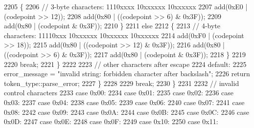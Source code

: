 \begin{DoxyCode}
2205                             \{
2206                                 \textcolor{comment}{// 3-byte characters: 1110xxxx 10xxxxxx 10xxxxxx}
2207                                 add(0xE0 | (codepoint >> 12));
2208                                 add(0x80 | ((codepoint >> 6) & 0x3F));
2209                                 add(0x80 | (codepoint & 0x3F));
2210                             \}
2211                             \textcolor{keywordflow}{else}
2212                             \{
2213                                 \textcolor{comment}{// 4-byte characters: 11110xxx 10xxxxxx 10xxxxxx 10xxxxxx}
2214                                 add(0xF0 | (codepoint >> 18));
2215                                 add(0x80 | ((codepoint >> 12) & 0x3F));
2216                                 add(0x80 | ((codepoint >> 6) & 0x3F));
2217                                 add(0x80 | (codepoint & 0x3F));
2218                             \}
2219 
2220                             \textcolor{keywordflow}{break};
2221                         \}
2222 
2223                         \textcolor{comment}{// other characters after escape}
2224                         \textcolor{keywordflow}{default}:
2225                             error\_message = \textcolor{stringliteral}{"invalid string: forbidden character after backslash"};
2226                             \textcolor{keywordflow}{return} token\_type::parse\_error;
2227                     \}
2228 
2229                     \textcolor{keywordflow}{break};
2230                 \}
2231 
2232                 \textcolor{comment}{// invalid control characters}
2233                 \textcolor{keywordflow}{case} 0x00:
2234                 \textcolor{keywordflow}{case} 0x01:
2235                 \textcolor{keywordflow}{case} 0x02:
2236                 \textcolor{keywordflow}{case} 0x03:
2237                 \textcolor{keywordflow}{case} 0x04:
2238                 \textcolor{keywordflow}{case} 0x05:
2239                 \textcolor{keywordflow}{case} 0x06:
2240                 \textcolor{keywordflow}{case} 0x07:
2241                 \textcolor{keywordflow}{case} 0x08:
2242                 \textcolor{keywordflow}{case} 0x09:
2243                 \textcolor{keywordflow}{case} 0x0A:
2244                 \textcolor{keywordflow}{case} 0x0B:
2245                 \textcolor{keywordflow}{case} 0x0C:
2246                 \textcolor{keywordflow}{case} 0x0D:
2247                 \textcolor{keywordflow}{case} 0x0E:
2248                 \textcolor{keywordflow}{case} 0x0F:
2249                 \textcolor{keywordflow}{case} 0x10:
2250                 \textcolor{keywordflow}{case} 0x11:

\end{DoxyCode}
